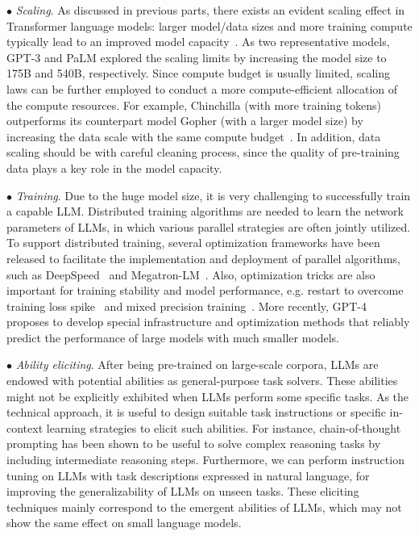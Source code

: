 $\bullet$ \emph{Scaling}. As discussed in previous parts, there exists an evident scaling effect in Transformer language models:   larger model/data sizes and more training compute typically lead to an improved model capacity~\cite{Kaplan-arxiv-2020-Scaling,Hoffmann-arxiv-2022-Training}. As two representative models,  GPT-3 and PaLM explored the scaling limits  by increasing the model size to 175B and 540B, respectively. Since compute budget is usually limited,  scaling laws can be further  employed to conduct a more compute-efficient allocation of the compute resources. For example,  Chinchilla (with more training tokens) outperforms its counterpart model Gopher (with a larger model size) by increasing the data scale with the same compute budget~\cite{Hoffmann-arxiv-2022-Training}. In addition,  data scaling should be with careful cleaning process,  since the quality of pre-training data plays a key role in the model capacity. 

$\bullet$ \emph{Training}. Due to the huge model size, it is very challenging to successfully train a capable LLM. Distributed training algorithms are needed to learn the network parameters of LLMs, in which various parallel strategies  are often jointly utilized. To support distributed training, several optimization frameworks have been released to facilitate the implementation and deployment of parallel algorithms, such as DeepSpeed~\cite{Rasley-KDD-2020-DeepSpeed} and Megatron-LM~\cite{Shoeybi-arXiv-2019-Megatron, Narayanan-ACM-2021-Efficient, Korthikanti-arxiv-2022-reducing}. Also, optimization tricks are also important for training stability and model performance, e.g. restart to overcome  training loss spike~\cite{Chowdhery-arxiv-2022-PaLM} and mixed precision training~\cite{Scao-arxiv-2022-BLOOM}. More recently, GPT-4~\cite{OpenAI-OpenAI-2023-GPT-4} proposes to develop special infrastructure and optimization methods that reliably predict the performance of large models with much smaller models. 

$\bullet$ \emph{Ability eliciting}. After being pre-trained on large-scale corpora, LLMs are endowed with potential abilities as general-purpose task solvers. These abilities might not be explicitly exhibited when LLMs perform some specific  tasks. As the technical  approach, it is useful to design suitable task instructions or specific  in-context learning strategies to elicit such abilities. For instance, chain-of-thought prompting has been shown to be useful to solve complex reasoning tasks by including intermediate reasoning steps. Furthermore, we can  perform instruction tuning on LLMs with task descriptions expressed in natural language, for improving  the generalizability  of LLMs on unseen tasks. These eliciting  techniques  mainly correspond to the emergent abilities of LLMs, which may not show the same effect on small language models. 

